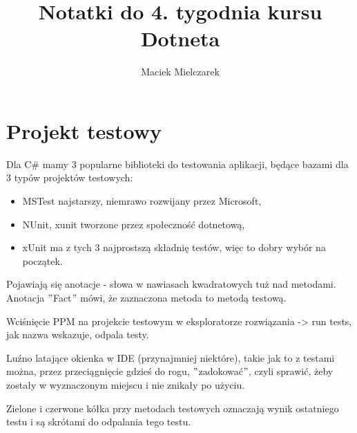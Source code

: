 \documentclass[10pt]{article}
\title{Notatki do 4. tygodnia kursu Dotneta}
\author{Maciek Mielczarek}
\begin{document}
\maketitle

\tableofcontents

\section{Projekt testowy}
Dla C\# mamy 3 popularne biblioteki do testowania aplikacji, będące bazami dla 3 typów projektów testowych:
\begin{itemize}
\item MSTest najstarszy, niemrawo rozwijany przez Microsoft,
\item NUnit, xunit tworzone przez społeczność dotnetową,
\item xUnit ma z tych 3 najprostszą składnię testów, więc to dobry wybór na początek.
\end{itemize}

Pojawiają się anotacje - słowa w nawiasach kwadratowych tuż nad metodami. Anotacja $"$Fact$"$ mówi, że zaznaczona metoda to metodą testową.

Wciśnięcie PPM na projekcie testowym w eksploratorze rozwiązania -> run tests, jak nazwa wskazuje, odpala testy.

Luźno latające okienka w IDE (przynajmniej niektóre), takie jak to z testami można, przez przeciągnięcie gdzieś do rogu, $"$zadokować$"$, czyli sprawić, żeby zostały w wyznaczonym miejscu i nie znikały po użyciu.

Zielone i czerwone kółka przy metodach testowych oznaczają wynik ostatniego testu i są skrótami do odpalania tego testu.
\end{document}
